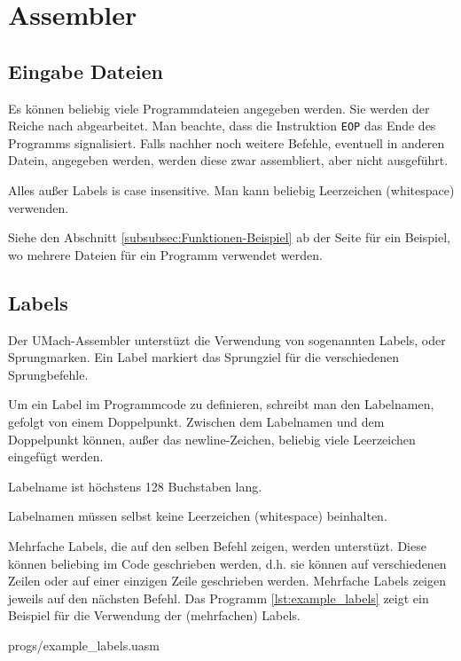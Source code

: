 \section{Assembler}

\subsection{Eingabe Dateien}

Es können beliebig viele Programmdateien angegeben werden. Sie werden der
Reiche nach abgearbeitet. Man beachte, dass die Instruktion \texttt{EOP} das
Ende des Programms signalisiert. Falls nachher noch weitere Befehle, eventuell
in anderen Datein, angegeben werden, werden diese zwar assembliert, aber nicht
ausgeführt.

Alles außer Labels is case insensitive. Man kann beliebig Leerzeichen
(whitespace) verwenden.


Siehe den Abschnitt \ref{subsubsec:Funktionen-Beispiel} ab der Seite
\pageref{subsubsec:Funktionen-Beispiel} für ein Beispiel, wo mehrere Dateien
für ein Programm verwendet werden.

\subsection{Labels}

Der UMach-Assembler unterstüzt die Verwendung von sogenannten \glqq Labels\grqq,
oder Sprungmarken. Ein Label markiert das Sprungziel für die verschiedenen
Sprungbefehle.

Um ein Label im Programmcode zu definieren, schreibt man den
Labelnamen, gefolgt von einem Doppelpunkt. Zwischen dem Labelnamen und dem
Doppelpunkt können, außer das \glqq newline\grqq-Zeichen, beliebig viele
Leerzeichen eingefügt werden.

Labelname ist höchstens 128 Buchstaben lang.

Labelnamen müssen selbst keine Leerzeichen (whitespace) beinhalten.

Mehrfache Labels, die auf den selben Befehl zeigen, werden unterstüzt. Diese
können beliebing im Code geschrieben werden, d.h. sie können auf verschiedenen
Zeilen oder auf einer einzigen Zeile geschrieben werden. Mehrfache Labels
zeigen jeweils auf den nächsten Befehl. Das Programm \ref{lst:example_labels}
zeigt ein Beispiel für die Verwendung der (mehrfachen) Labels.


{progs/example_labels.uasm}

